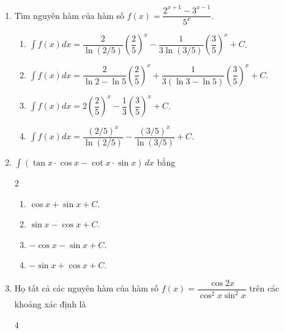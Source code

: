\documentclass[12pt]{article}
\begin{document}
\begin{enumerate}[label=\textbf{Câu \arabic*.}]
\begin{multicols}{2}
\begin{enumerate}[label=\textbf{\Alph*.}]
				\item $\dfrac{x^2}{2} - 2\ln(x-1) + C$.
				\item $x + 2\ln(x-1) + C$.
				\item $\dfrac{x^2}{2} + 2\ln(x-1) + C$.
				\item $x^2 + 2\ln(x-1) + C$.
			\end{enumerate}
		\end{multicols}
		
		\item Tìm nguyên hàm của hàm số $f(x) = \dfrac{2^{x+1} - 3^{x-1}}{5^x}$.
		\begin{enumerate}[label=\textbf{\Alph*.}]
			\item $\displaystyle \int f(x)dx = \dfrac{2}{\ln(2/5)} \left(\dfrac{2}{5}\right)^x - \dfrac{1}{3\ln(3/5)} \left(\dfrac{3}{5}\right)^x + C$.\\
			\item $\displaystyle \int f(x)dx = \dfrac{2}{\ln 2 - \ln 5} \left(\dfrac{2}{5}\right)^x + \dfrac{1}{3(\ln 3 - \ln 5)} \left(\dfrac{3}{5}\right)^x + C$.\\
			\item $\displaystyle \int f(x)dx = 2 \left(\dfrac{2}{5}\right)^x - \dfrac{1}{3} \left(\dfrac{3}{5}\right)^x + C$.\\
			\item $\displaystyle \int f(x)dx = \dfrac{(2/5)^x}{\ln(2/5)} - \dfrac{(3/5)^x}{\ln(3/5)} + C$.
		\end{enumerate}
		
		\item $\displaystyle \int (\tan x \cdot \cos x - \cot x \cdot \sin x) \,dx$ bằng
		\begin{multicols}{2}
			\begin{enumerate}[label=\textbf{\Alph*.}]
				
				\item $\cos x + \sin x + C$.
				\item $\sin x - \cos x + C$.
				\item $-\cos x - \sin x + C$.
				\item $-\sin x + \cos x + C$.
			\end{enumerate}
		\end{multicols}
		
		\item Họ tất cả các nguyên hàm của hàm số $f(x) = \dfrac{\cos 2x}{\cos^2 x \sin^2 x}$ trên các khoảng xác định là
		\begin{multicols}{4}
			\begin{enumerate}[label=\textbf{\Alph*.}]
				

\end{enumerate}
\end{multicols}
\end{enumerate}
\end{document}
